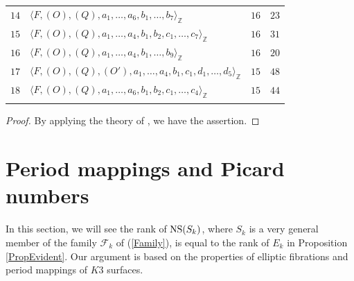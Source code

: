 \documentclass[10pt]{article}
\begin{document}
\begin{longtable}{llll}
\vspace{1mm}$14$ &$\langle F, (O),  (Q),a_1 ,\ldots, a_6,b_1, \ldots,b_{7} \rangle_\mathbb{Z}$ &\hspace{3.9mm} $16$ &\hspace{12.9mm} $23$    \\
\vspace{1mm}$15$ &$\langle F, (O),(Q), a_1 ,\ldots,a_4, b_1,b_2, c_1,\ldots ,c_7 \rangle_\mathbb{Z}$ &\hspace{3.9mm} $16$ &\hspace{12.9mm} $31$   \\
\vspace{1mm}$16$ &$\langle F, (O),  (Q),a_1 ,\ldots, a_4,b_1, \ldots,b_9 \rangle_\mathbb{Z}$ &\hspace{3.9mm} $16$  &\hspace{12.9mm} $20$  \\
\vspace{1mm}$17$ &$\langle F, (O),  (Q), (O'), a_1 ,\ldots, a_4,b_1,c_1,d_1, \ldots,d_5 \rangle_\mathbb{Z}$ &\hspace{3.9mm} $15$ &\hspace{12.9mm} $48$   \\
\vspace{1mm}    $18$ & $\langle F, (O),(Q), a_1 ,\ldots,a_6, b_1,b_2, c_1,\ldots ,c_4 \rangle_\mathbb{Z}$ &\hspace{3.9mm} $15$ &\hspace{12.9mm} $44$  \\
\hline\\
\end{longtable} 

\begin{proof}
By applying the theory of \cite{Shioda}, we have the assertion.
\end{proof}



 
 
 \section{Period mappings and Picard numbers}
 
 In this section, we will see the rank of ${\rm NS} (S_k)$, where $S_k$ is a very general member of the family $\mathscr{F}_k$ of (\ref{Family}), is equal to the rank of $E_k$ in Proposition \ref{PropEvident}.
Our argument is based on the properties of  elliptic fibrations and period mappings of $K3$ surfaces.
 
\end{document}
